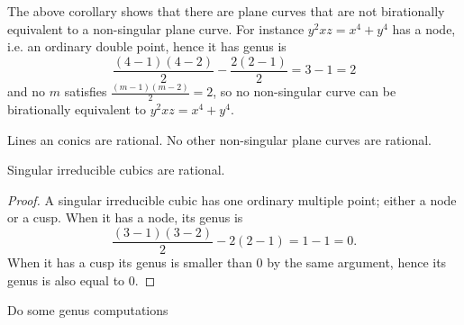     \begin{example}
        The above corollary shows that there are plane curves that are not birationally equivalent to a non-singular plane curve. For instance $y^2xz=x^4+y^4$ has a node, i.e. an ordinary double point, hence it has genus is
        $$
            \frac{(4-1)(4-2)}{2} - \frac{2(2-1)}{2}=3-1 = 2 
        $$
        and no $m$ satisfies $\frac{(m-1)(m-2)}{2}=2$, so no non-singular curve can be birationally equivalent to $y^2xz=x^4+y^4$.
    \end{example}
    \begin{corollary}
        Lines an conics are rational. No other non-singular plane curves are rational.
    \end{corollary}
    \begin{corollary}
        Singular irreducible cubics are rational.  
    \end{corollary}
    \begin{proof}
        A singular irreducible cubic has one ordinary multiple point; either a node or a cusp. When it has a node, its genus is 
        $$
            \frac{(3-1)(3-2)}{2}-2(2-1)=1- 1 = 0.
        $$ 
        When it has a cusp its genus is smaller than $0$ by the same argument, hence its genus is also equal to $0$. 
    \end{proof}
    \begin{example}
        {\Large Do some genus computations}
    \end{example}
